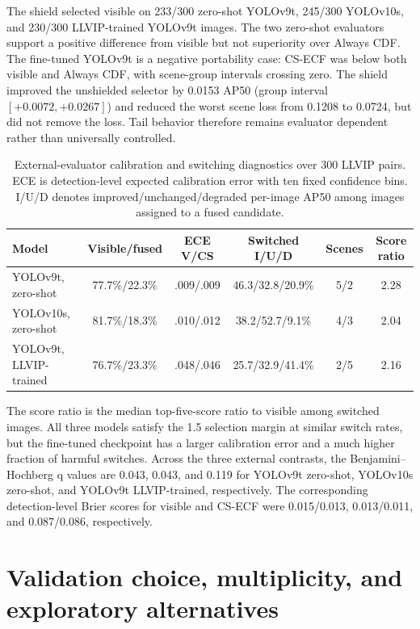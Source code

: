 \documentclass[11pt]{article}
\begin{document}
The shield selected visible on 233/300 zero-shot YOLOv9t, 245/300 YOLOv10s,
and 230/300 LLVIP-trained YOLOv9t images. The two zero-shot evaluators support
a positive difference from visible but not superiority over Always CDF. The
fine-tuned YOLOv9t is a negative portability case: CS-ECF was below both
visible and Always CDF, with scene-group intervals crossing zero. The shield
improved the unshielded selector by 0.0153 AP50 (group interval
\([+0.0072,+0.0267]\)) and reduced the worst scene loss from 0.1208 to 0.0724,
but did not remove the loss. Tail behavior therefore remains evaluator
dependent rather than universally controlled.

\begin{table}[ht]
\centering
\scriptsize
\setlength{\tabcolsep}{3pt}
\caption{External-evaluator calibration and switching diagnostics over 300
LLVIP pairs. ECE is detection-level expected calibration error with ten fixed
confidence bins. I/U/D denotes improved/unchanged/degraded per-image AP50 among
images assigned to a fused candidate.}
\begin{tabular}{@{}lccccc@{}}
\toprule
Model & Visible/fused & ECE V/CS & Switched I/U/D & Scenes & Score ratio \\
\midrule
YOLOv9t, zero-shot & 77.7\%/22.3\% & .009/.009 &
46.3/32.8/20.9\% & 5/2 & 2.28 \\
YOLOv10s, zero-shot & 81.7\%/18.3\% & .010/.012 &
38.2/52.7/9.1\% & 4/3 & 2.04 \\
YOLOv9t, LLVIP-trained & 76.7\%/23.3\% & .048/.046 &
25.7/32.9/41.4\% & 2/5 & 2.16 \\
\bottomrule
\end{tabular}
\end{table}

The score ratio is the median top-five-score ratio to visible among switched
images. All three models satisfy the 1.5 selection margin at similar switch
rates, but the fine-tuned checkpoint has a larger calibration error and a much
higher fraction of harmful switches. Across the three external contrasts, the
Benjamini--Hochberg q values are 0.043, 0.043, and 0.119 for YOLOv9t
zero-shot, YOLOv10s zero-shot, and YOLOv9t LLVIP-trained, respectively.
The corresponding detection-level Brier scores for visible and CS-ECF were
0.015/0.013, 0.013/0.011, and 0.087/0.086, respectively.

\small
\section{Validation choice, multiplicity, and exploratory alternatives}
\end{document}
